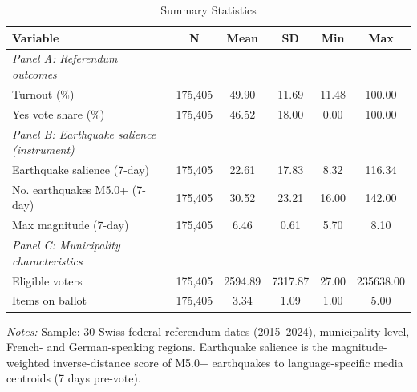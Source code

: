 \begin{table}[htbp]
\centering
\caption{Summary Statistics}
\label{tab:summary}
\begin{threeparttable}
\small
\begin{tabular}{lccccc}
\toprule
Variable & N & Mean & SD & Min & Max \\
\midrule
\textit{Panel A: Referendum outcomes} & & & & & \\
Turnout (\%) & 175,405 & 49.90 & 11.69 & 11.48 & 100.00 \\
Yes vote share (\%) & 175,405 & 46.52 & 18.00 & 0.00 & 100.00 \\
\addlinespace
\textit{Panel B: Earthquake salience (instrument)} & & & & & \\
Earthquake salience (7-day) & 175,405 & 22.61 & 17.83 & 8.32 & 116.34 \\
No. earthquakes M5.0+ (7-day) & 175,405 & 30.52 & 23.21 & 16.00 & 142.00 \\
Max magnitude (7-day) & 175,405 & 6.46 & 0.61 & 5.70 & 8.10 \\
\addlinespace
\textit{Panel C: Municipality characteristics} & & & & & \\
Eligible voters & 175,405 & 2594.89 & 7317.87 & 27.00 & 235638.00 \\
Items on ballot & 175,405 & 3.34 & 1.09 & 1.00 & 5.00 \\
\bottomrule
\end{tabular}
\begin{tablenotes}[flushleft]
\footnotesize
\item \textit{Notes:} Sample: 30 Swiss federal referendum dates (2015--2024), municipality level, French- and German-speaking regions. Earthquake salience is the magnitude-weighted inverse-distance score of M5.0+ earthquakes to language-specific media centroids (7 days pre-vote).
\end{tablenotes}
\end{threeparttable}
\end{table}
